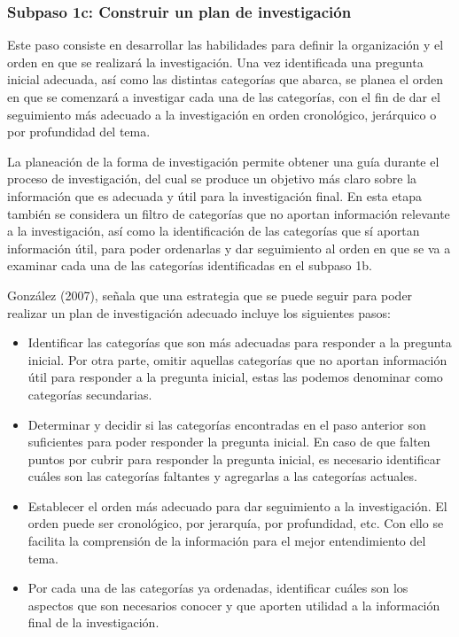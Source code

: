 
\subsubsection{Subpaso 1c: Construir un plan de investigación}
\label{secPaso1cCap2}

Este paso consiste en desarrollar las habilidades para definir la organización y el orden en que se realizará la investigación. Una vez identificada una pregunta inicial adecuada, así como las distintas categorías que abarca, se planea el orden en que se comenzará a investigar cada una de las categorías, con el fin de dar el seguimiento más adecuado a la investigación en orden cronológico, jerárquico o por profundidad del tema.

La planeación de la forma de investigación permite obtener una guía durante el proceso de investigación, del cual se produce un objetivo más claro sobre la información que es adecuada y útil para la investigación final. En esta etapa también se considera un filtro de categorías que no aportan información relevante a la investigación, así como la identificación de las categorías que sí aportan información útil, para poder ordenarlas y dar seguimiento al orden en que se va a examinar cada una de las categorías identificadas en el subpaso 1b.

González (2007), señala que una estrategia que se puede seguir para poder realizar un plan de investigación adecuado incluye los siguientes pasos:

\begin{itemize}
  \item Identificar las categorías que son más adecuadas para responder a la pregunta inicial. Por otra parte, omitir aquellas categorías que no aportan información útil para responder a la pregunta inicial, estas las podemos denominar como categorías secundarias.
  \item Determinar y decidir si las categorías encontradas en el paso anterior son suficientes para poder responder la pregunta inicial. En caso de que falten puntos por cubrir para responder la pregunta inicial, es necesario identificar cuáles son las categorías faltantes y agregarlas a las categorías actuales.
  \item Establecer el orden más adecuado para dar seguimiento a la investigación. El orden puede ser cronológico, por jerarquía, por profundidad, etc. Con ello se facilita la comprensión de la información para el mejor entendimiento del tema.
  \item Por cada una de las categorías ya ordenadas, identificar cuáles son los aspectos que son necesarios conocer y que aporten utilidad a la información final de la investigación.
\end{itemize}

